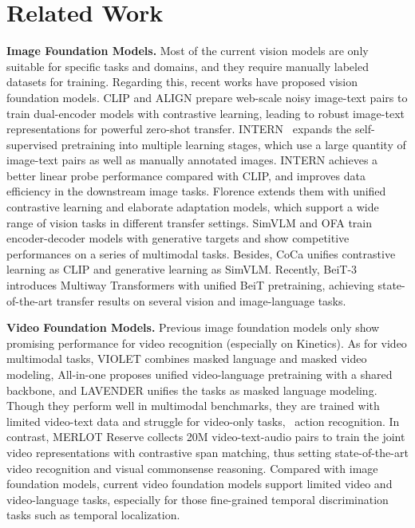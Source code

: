 \section{Related Work}

\textbf{Image Foundation Models.}
Most of the current vision models are only suitable for specific tasks and domains,
and they require manually labeled datasets for training.
Regarding this, recent works have proposed vision foundation models. CLIP \citep{CLIP} and ALIGN \citep{align} prepare web-scale noisy image-text pairs to train dual-encoder models with contrastive learning,
leading to robust image-text representations for powerful zero-shot transfer. 
INTERN~\citep{shao2021intern} expands the self-supervised pretraining into multiple learning stages, which use a large quantity of image-text pairs as well as manually annotated images. INTERN achieves a better linear probe performance compared with CLIP, and improves data efficiency in the downstream image tasks.
Florence \citep{florence} extends them with unified contrastive learning \citep{unicl} and elaborate adaptation models, which support a wide range of vision tasks in different transfer settings. SimVLM \citep{simvlm} and OFA \citep{ofa} train encoder-decoder models with generative targets and show competitive performances on a series of multimodal tasks. Besides, CoCa \citep{coca} unifies contrastive learning as CLIP and generative learning as SimVLM. Recently, BeiT-3 \citep{beit3} introduces Multiway Transformers with unified BeiT \citep{beit} pretraining, achieving state-of-the-art transfer results on several vision and image-language tasks.

\textbf{Video Foundation Models.}
Previous image foundation models \citep{florence,coca} only show promising performance for video recognition (especially on Kinetics). As for video multimodal tasks, VIOLET \citep{violet} combines masked language and masked video modeling, All-in-one \citep{all_in_one} proposes unified video-language pretraining with a shared backbone, and LAVENDER \citep{lavender} unifies the tasks as masked language modeling. Though they perform well in multimodal benchmarks, they are trained with limited video-text data and struggle for video-only tasks, \eg\ action recognition. In contrast,
MERLOT Reserve \citep{reserve} collects 20M video-text-audio pairs to train the joint video representations with contrastive span matching, thus setting state-of-the-art video recognition and visual commonsense reasoning. Compared with image foundation models,
current video foundation models support limited video and video-language tasks,
especially for those fine-grained temporal discrimination tasks such as temporal localization.

